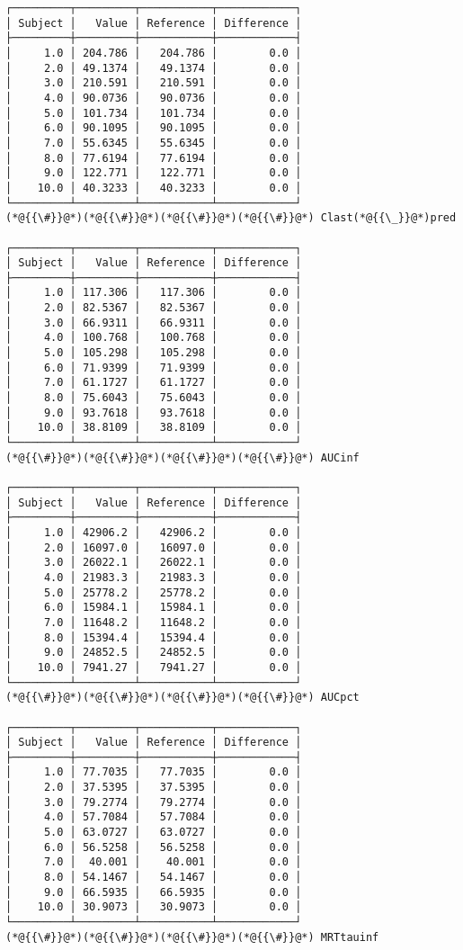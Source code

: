 \documentclass[12pt,a4paper]{article}
\begin{document}
\begin{lstlisting}
┌─────────┬─────────┬───────────┬────────────┐
│ Subject │   Value │ Reference │ Difference │
├─────────┼─────────┼───────────┼────────────┤
│     1.0 │ 204.786 │   204.786 │        0.0 │
│     2.0 │ 49.1374 │   49.1374 │        0.0 │
│     3.0 │ 210.591 │   210.591 │        0.0 │
│     4.0 │ 90.0736 │   90.0736 │        0.0 │
│     5.0 │ 101.734 │   101.734 │        0.0 │
│     6.0 │ 90.1095 │   90.1095 │        0.0 │
│     7.0 │ 55.6345 │   55.6345 │        0.0 │
│     8.0 │ 77.6194 │   77.6194 │        0.0 │
│     9.0 │ 122.771 │   122.771 │        0.0 │
│    10.0 │ 40.3233 │   40.3233 │        0.0 │
└─────────┴─────────┴───────────┴────────────┘
(*@{{\#}}@*)(*@{{\#}}@*)(*@{{\#}}@*)(*@{{\#}}@*) Clast(*@{{\_}}@*)pred

┌─────────┬─────────┬───────────┬────────────┐
│ Subject │   Value │ Reference │ Difference │
├─────────┼─────────┼───────────┼────────────┤
│     1.0 │ 117.306 │   117.306 │        0.0 │
│     2.0 │ 82.5367 │   82.5367 │        0.0 │
│     3.0 │ 66.9311 │   66.9311 │        0.0 │
│     4.0 │ 100.768 │   100.768 │        0.0 │
│     5.0 │ 105.298 │   105.298 │        0.0 │
│     6.0 │ 71.9399 │   71.9399 │        0.0 │
│     7.0 │ 61.1727 │   61.1727 │        0.0 │
│     8.0 │ 75.6043 │   75.6043 │        0.0 │
│     9.0 │ 93.7618 │   93.7618 │        0.0 │
│    10.0 │ 38.8109 │   38.8109 │        0.0 │
└─────────┴─────────┴───────────┴────────────┘
(*@{{\#}}@*)(*@{{\#}}@*)(*@{{\#}}@*)(*@{{\#}}@*) AUCinf

┌─────────┬─────────┬───────────┬────────────┐
│ Subject │   Value │ Reference │ Difference │
├─────────┼─────────┼───────────┼────────────┤
│     1.0 │ 42906.2 │   42906.2 │        0.0 │
│     2.0 │ 16097.0 │   16097.0 │        0.0 │
│     3.0 │ 26022.1 │   26022.1 │        0.0 │
│     4.0 │ 21983.3 │   21983.3 │        0.0 │
│     5.0 │ 25778.2 │   25778.2 │        0.0 │
│     6.0 │ 15984.1 │   15984.1 │        0.0 │
│     7.0 │ 11648.2 │   11648.2 │        0.0 │
│     8.0 │ 15394.4 │   15394.4 │        0.0 │
│     9.0 │ 24852.5 │   24852.5 │        0.0 │
│    10.0 │ 7941.27 │   7941.27 │        0.0 │
└─────────┴─────────┴───────────┴────────────┘
(*@{{\#}}@*)(*@{{\#}}@*)(*@{{\#}}@*)(*@{{\#}}@*) AUCpct

┌─────────┬─────────┬───────────┬────────────┐
│ Subject │   Value │ Reference │ Difference │
├─────────┼─────────┼───────────┼────────────┤
│     1.0 │ 77.7035 │   77.7035 │        0.0 │
│     2.0 │ 37.5395 │   37.5395 │        0.0 │
│     3.0 │ 79.2774 │   79.2774 │        0.0 │
│     4.0 │ 57.7084 │   57.7084 │        0.0 │
│     5.0 │ 63.0727 │   63.0727 │        0.0 │
│     6.0 │ 56.5258 │   56.5258 │        0.0 │
│     7.0 │  40.001 │    40.001 │        0.0 │
│     8.0 │ 54.1467 │   54.1467 │        0.0 │
│     9.0 │ 66.5935 │   66.5935 │        0.0 │
│    10.0 │ 30.9073 │   30.9073 │        0.0 │
└─────────┴─────────┴───────────┴────────────┘
(*@{{\#}}@*)(*@{{\#}}@*)(*@{{\#}}@*)(*@{{\#}}@*) MRTtauinf


\end{lstlisting}
\end{document}

